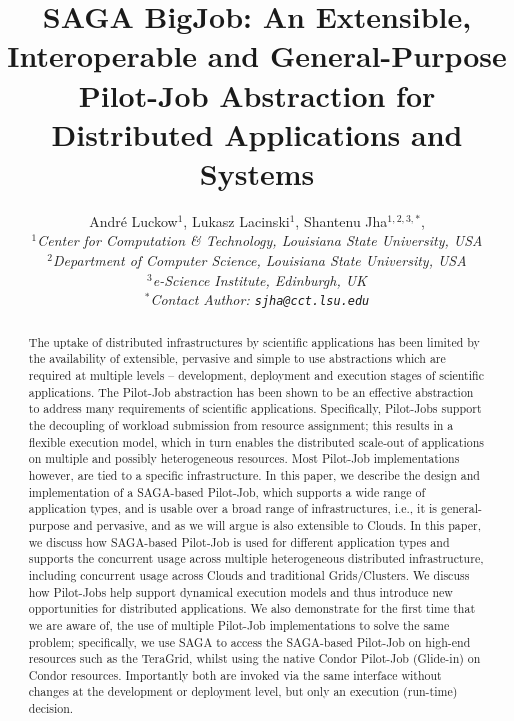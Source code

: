 \documentclass[conference,final]{IEEEtran}
\title{SAGA BigJob: An Extensible, Interoperable and General-Purpose
  Pilot-Job Abstraction for Distributed Applications and Systems}
\author{
Andr\'e Luckow$^{1}$, Lukasz Lacinski$^{1}$,   Shantenu Jha$^{1,2,3,*}$,\\
  \small{\emph{$^{1}$Center for Computation \& Technology, Louisiana State University, USA}}\\
  \small{\emph{$^{2}$Department of Computer Science, Louisiana State University, USA}}\\
  \small{\emph{$^{3}$e-Science Institute, Edinburgh, UK}}\\
  \small{\emph{$^{*}$Contact Author: \texttt{sjha@cct.lsu.edu}}}\\
}
\newcommand{\alnote}[1]{ {\textcolor{blue} { ***AL: #1 }}}
\newcommand{\jhanote}[1]{ {\textcolor{red} { ***SJ: #1 }}}
\newcommand{\alnote}[1]{}
\newcommand{\jhanote}[1]{}
\begin{document}
 

\maketitle    

\begin{abstract}
  The uptake of distributed infrastructures by scientific applications
  has been limited by the availability of extensible, pervasive and
  simple to use abstractions which are required at multiple levels --
  development, deployment and execution stages of scientific
  applications. The Pilot-Job abstraction has been shown to be an
  effective abstraction to address many requirements of scientific
  applications.  Specifically, Pilot-Jobs support the decoupling of
  workload submission from resource assignment; this results in a
  flexible execution model, which in turn enables the distributed
  scale-out of applications on multiple and possibly heterogeneous
  resources.  Most Pilot-Job implementations however, are tied to a
  specific infrastructure. In this paper, we describe the design and
  implementation of a SAGA-based Pilot-Job, which supports a wide
  range of application types, and is usable over a broad range of
  infrastructures, i.e., it is general-purpose and pervasive, and as
  we will argue is also extensible to Clouds.  In this paper, we
  discuss how SAGA-based Pilot-Job is used for different application
  types and supports the concurrent usage across multiple
  heterogeneous distributed infrastructure, including concurrent usage
  across Clouds and traditional Grids/Clusters.  %
  We discuss how Pilot-Jobs help support dynamical execution models
  and thus introduce new opportunities for distributed applications.
  We also demonstrate for the first time that we are aware of, the use
  of multiple Pilot-Job implementations to solve the same problem;
  specifically, we use SAGA to access the SAGA-based Pilot-Job on
  high-end resources such as the TeraGrid, whilst using the native
  Condor Pilot-Job (Glide-in) on Condor resources. Importantly both
  are invoked via the same interface without changes at the
  development or deployment level, but only an execution (run-time)
  decision.
\end{abstract}
\end{document}
